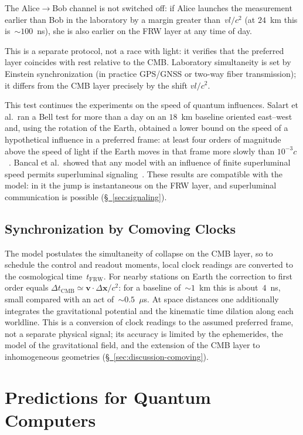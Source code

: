 \documentclass[11pt,a4paper]{article}
\begin{document}
The Alice$\to$Bob channel is not switched off: if Alice launches the measurement earlier than Bob in the laboratory by a margin greater than~$vl/c^2$ (at $24$~km this is~$\sim100$~ns), she is also earlier on the FRW layer at any time of day.

This is a separate protocol, not a race with light: it verifies that the preferred layer coincides with rest relative to the CMB. Laboratory simultaneity is set by Einstein synchronization (in practice GPS/GNSS or two-way fiber transmission); it differs from the CMB layer precisely by the shift $vl/c^2$.

This test continues the experiments on the speed of quantum influences. Salart et al.\ ran a Bell test for more than a day on an $18$~km baseline oriented east--west and, using the rotation of the Earth, obtained a lower bound on the speed of a hypothetical influence in a preferred frame: at least four orders of magnitude above the speed of light if the Earth moves in that frame more slowly than $10^{-3}c$~\cite{salart2008}. Bancal et al.\ showed that any model with an influence of finite superluminal speed permits superluminal signaling~\cite{bancal2012}. These results are compatible with the model: in it the jump is instantaneous on the FRW layer, and superluminal communication is possible (\hyperref[sec:signaling]{\S~\ref*{sec:signaling}}).

\subsection{Synchronization by Comoving Clocks}

The model postulates the simultaneity of collapse on the CMB layer, so to schedule the control and readout moments, local clock readings are converted to the cosmological time~$t_{\mathrm{FRW}}$. For nearby stations on Earth the correction to first order equals $\Delta t_{\mathrm{CMB}}\simeq\mathbf{v}\!\cdot\!\Delta\mathbf{x}/c^2$: for a baseline of~$\sim1$~km this is about~$4$~ns, small compared with an act of~$\sim0.5$~$\mu$s. At space distances one additionally integrates the gravitational potential and the kinematic time dilation along each worldline. This is a conversion of clock readings to the assumed preferred frame, not a separate physical signal; its accuracy is limited by the ephemerides, the model of the gravitational field, and the extension of the CMB layer to inhomogeneous geometries (\hyperref[sec:discussion-comoving]{\S~\ref*{sec:discussion-comoving}}).

\section{Predictions for Quantum Computers}
\label{sec:ft}
\end{document}
